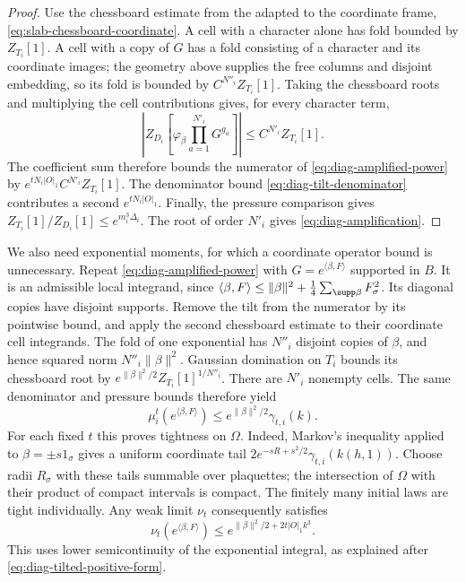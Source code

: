 \begin{proof}
Use the chessboard estimate from the adapted to the coordinate
frame, \eqref{eq:slab-chessboard-coordinate}. A cell with a
character alone has fold bounded by $Z_{T_i}[1]$. A cell with
a copy of $G$ has a fold consisting of a character and its
coordinate images; the geometry above supplies the free columns
and disjoint embedding, so its fold is bounded by
$C^{N''_i}Z_{T_i}[1]$. Taking the chessboard roots and multiplying
the cell contributions gives, for every character term,
\[
 \left|Z_{D_i}\left[\varphi_\beta
                    \prod_{a=1}^{N'_i}G^{g_a}\right]\right|
                \le C^{N'_i}Z_{T_i}[1].
\]
The coefficient sum therefore bounds the numerator of
\eqref{eq:diag-amplified-power} by
$e^{tN_i|O|_1}C^{N'_i}Z_{T_i}[1]$. The denominator bound
\eqref{eq:diag-tilt-denominator} contributes a second
$e^{tN_i|O|_1}$. Finally, the pressure comparison gives
$Z_{T_i}[1]/Z_{D_i}[1]\le e^{m_i^3\Delta_i}$.
The root of order $N'_i$ gives
\eqref{eq:diag-amplification}.
\end{proof}

We also need exponential moments, for which a coordinate operator
bound is unnecessary. Repeat \eqref{eq:diag-amplified-power} with
$G=e^{\langle\beta,F\rangle}$ supported in $B$. It is an admissible
local integrand, since
$\langle\beta,F\rangle\le\|\beta\|^2+
\frac14\sum_{\supp\beta}F_\sigma^2$. Its diagonal copies have
disjoint supports. Remove the tilt from the numerator by its
pointwise bound, and apply the second chessboard estimate to
their coordinate cell integrands. The fold of one exponential
has $N''_i$ disjoint copies of $\beta$, and hence squared norm
$N''_i\|\beta\|^2$. Gaussian domination on $T_i$ bounds its
chessboard root by
$e^{\|\beta\|^2/2}Z_{T_i}[1]^{1/N''_i}$. There are $N'_i$
nonempty cells. The same denominator and pressure bounds
therefore yield
\begin{equation}\label{eq:diag-tilted-domination}
 \mu_i^t(e^{\langle\beta,F\rangle})
      \le e^{\|\beta\|^2/2}\gamma_{t,i}(k).
\end{equation}
For each fixed $t$ this proves tightness on $\Omega$. Indeed,
Markov's inequality applied to $\beta=\pm s1_\sigma$ gives a
uniform coordinate tail $2e^{-sR+s^2/2}\gamma_{t,i}(k(h,1))$.
Choose radii $R_\sigma$ with these tails summable over plaquettes;
the intersection of $\Omega$ with their product of compact
intervals is compact. The finitely many initial laws are tight
individually. Any weak limit $\nu_t$ consequently satisfies
\begin{equation}\label{eq:diag-limit-domination}
 \nu_t(e^{\langle\beta,F\rangle})
      \le e^{\|\beta\|^2/2+2t|O|_1k^3}.
\end{equation}
This uses lower semicontinuity of the exponential integral,
as explained after \eqref{eq:diag-tilted-positive-form}.

